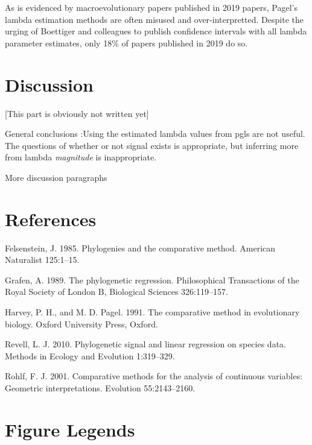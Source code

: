 \documentclass[]{article}
\begin{document}
As is evidenced by macroevolutionary papers published in 2019 papers,
Pagel's lambda estimation methods are often misused and
over-interpretted. Despite the urging of Boettiger and colleagues to
publish confidence intervals with all lambda parameter estimates, only
18\% of papers published in 2019 do so.

\section{Discussion}\label{discussion}

{[}This part is obviously not written yet{]} \hfill\break

General conclusions :Using the estimated lambda values from pgls are not
useful. The questions of whether or not signal exists is appropriate,
but inferring more from lambda \emph{magnitude} is inappropriate.
\hfill\break

More discussion paragraphs

\newpage

\section{References}\label{references}

\setlength{\parindent}{-0.25in} \setlength{\leftskip}{0.25in}
\setlength{\parskip}{8pt} \noindent

\hypertarget{refs}{}
\hypertarget{ref-Felsenstein1985}{}
Felsenstein, J. 1985. Phylogenies and the comparative method. American
Naturalist 125:1--15.

\hypertarget{ref-Grafen1989}{}
Grafen, A. 1989. The phylogenetic regression. Philosophical Transactions
of the Royal Society of London B, Biological Sciences 326:119--157.

\hypertarget{ref-HarveyPagel1991}{}
Harvey, P. H., and M. D. Pagel. 1991. The comparative method in
evolutionary biology. Oxford University Press, Oxford.

\hypertarget{ref-Revell2010}{}
Revell, L. J. 2010. Phylogenetic signal and linear regression on species
data. Methods in Ecology and Evolution 1:319--329.

\hypertarget{ref-Rohlf2001}{}
Rohlf, F. J. 2001. Comparative methods for the analysis of continuous
variables: Geometric interpretations. Evolution 55:2143--2160.

\newpage

\section{Figure Legends}\label{figure-legends}
\end{document}
